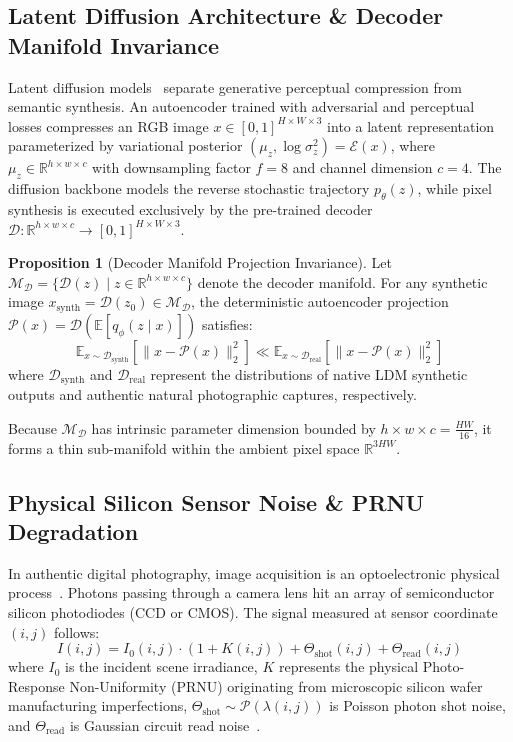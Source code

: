 \documentclass{article}
\theoremstyle{definition}
\newtheorem{proposition}{Proposition}
\begin{document}
\subsection{Latent Diffusion Architecture \& Decoder Manifold Invariance}
Latent diffusion models~\citep{rombach2022ldm} separate generative perceptual compression from semantic synthesis. An autoencoder trained with adversarial and perceptual losses compresses an RGB image $x \in [0, 1]^{H \times W \times 3}$ into a latent representation parameterized by variational posterior $(\mu_z, \log \sigma_z^2) = \mathcal{E}(x)$, where $\mu_z \in \mathbb{R}^{h \times w \times c}$ with downsampling factor $f = 8$ and channel dimension $c = 4$. The diffusion backbone models the reverse stochastic trajectory $p_\theta(z)$, while pixel synthesis is executed exclusively by the pre-trained decoder $\mathcal{D}: \mathbb{R}^{h \times w \times c} \to [0, 1]^{H \times W \times 3}$.

\begin{proposition}[Decoder Manifold Projection Invariance]
Let $\mathcal{M}_{\mathcal{D}} = \{ \mathcal{D}(z) \mid z \in \mathbb{R}^{h \times w \times c} \}$ denote the decoder manifold. For any synthetic image $x_{\text{synth}} = \mathcal{D}(z_0) \in \mathcal{M}_{\mathcal{D}}$, the deterministic autoencoder projection $\mathcal{P}(x) = \mathcal{D}(\mathbb{E}[q_\phi(z \mid x)])$ satisfies:
\begin{equation}
\mathbb{E}_{x \sim \mathcal{D}_{\text{synth}}}\left[ \| x - \mathcal{P}(x) \|_2^2 \right] \ll \mathbb{E}_{x \sim \mathcal{D}_{\text{real}}}\left[ \| x - \mathcal{P}(x) \|_2^2 \right]
\end{equation}
where $\mathcal{D}_{\text{synth}}$ and $\mathcal{D}_{\text{real}}$ represent the distributions of native LDM synthetic outputs and authentic natural photographic captures, respectively.
\end{proposition}

Because $\mathcal{M}_{\mathcal{D}}$ has intrinsic parameter dimension bounded by $h \times w \times c = \frac{H W}{16}$, it forms a thin sub-manifold within the ambient pixel space $\mathbb{R}^{3HW}$.

\subsection{Physical Silicon Sensor Noise \& PRNU Degradation}
In authentic digital photography, image acquisition is an optoelectronic physical process~\citep{fridrich2009digital}. Photons passing through a camera lens hit an array of semiconductor silicon photodiodes (CCD or CMOS). The signal measured at sensor coordinate $(i, j)$ follows:
\begin{equation}
I(i, j) = I_0(i, j) \cdot (1 + K(i, j)) + \Theta_{\text{shot}}(i, j) + \Theta_{\text{read}}(i, j)
\end{equation}
where $I_0$ is the incident scene irradiance, $K$ represents the physical Photo-Response Non-Uniformity (PRNU) originating from microscopic silicon wafer manufacturing imperfections, $\Theta_{\text{shot}} \sim \mathcal{P}(\lambda(i, j))$ is Poisson photon shot noise, and $\Theta_{\text{read}}$ is Gaussian circuit read noise~\citep{lukas2006digital}.
\end{document}
